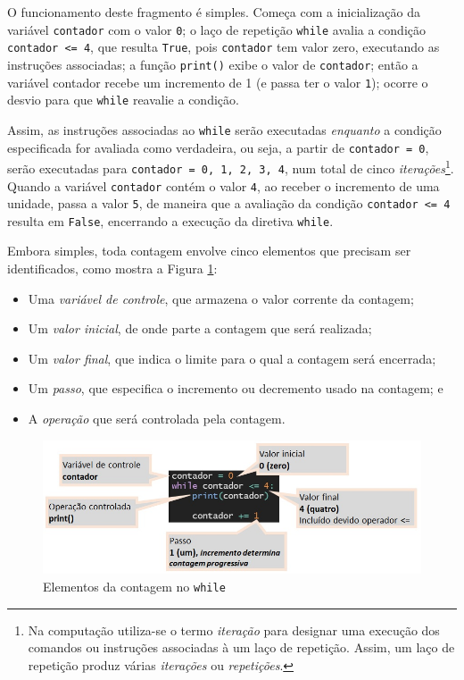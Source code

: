 \documentclass[
]{book}
\providecommand{\tightlist}{%
  \setlength{\itemsep}{0pt}\setlength{\parskip}{0pt}}
\begin{document}
O funcionamento deste fragmento é simples. Começa com a inicialização da variável \texttt{contador} com o valor \texttt{0}; o laço de repetição \texttt{while} avalia a condição \texttt{contador\ \textless{}=\ 4}, que resulta \texttt{True}, pois \texttt{contador} tem valor zero, executando as instruções associadas; a função \texttt{print()} exibe o valor de \texttt{contador}; então a variável contador recebe um incremento de 1 (e passa ter o valor \texttt{1}); ocorre o desvio para que \texttt{while} reavalie a condição.

Assim, as instruções associadas ao \texttt{while} serão executadas \emph{enquanto} a condição especificada for avaliada como verdadeira, ou seja, a partir de \texttt{contador\ =\ 0}, serão executadas para \texttt{contador\ =\ 0,\ 1,\ 2,\ 3,\ 4}, num total de cinco \emph{iterações}\footnote{Na computação utiliza-se o termo \emph{iteração} para designar uma execução dos comandos ou instruções associadas à um laço de repetição. Assim, um laço de repetição produz várias \emph{iterações} ou \emph{repetições}.}. Quando a variável \texttt{contador} contém o valor \texttt{4}, ao receber o incremento de uma unidade, passa a valor \texttt{5}, de maneira que a avaliação da condição \texttt{contador\ \textless{}=\ 4} resulta em \texttt{False}, encerrando a execução da diretiva \texttt{while}.

Embora simples, toda contagem envolve cinco elementos que precisam ser identificados, como mostra a Figura \ref{fig:05-02}:

\begin{itemize}
\tightlist
\item
  Uma \emph{variável de controle}, que armazena o valor corrente da contagem;
\item
  Um \emph{valor inicial}, de onde parte a contagem que será realizada;
\item
  Um \emph{valor final}, que indica o limite para o qual a contagem será encerrada;
\item
  Um \emph{passo}, que especifica o incremento ou decremento usado na contagem; e
\item
  A \emph{operação} que será controlada pela contagem.
\end{itemize}

\begin{figure}
\centering
\includegraphics{images/05-02.jpg}
\caption{\label{fig:05-02}Elementos da contagem no \texttt{while}}
\end{figure}
\end{document}
